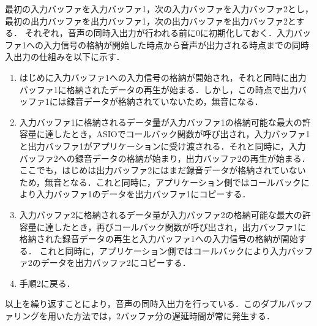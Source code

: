 最初の入力バッファを入力バッファ1，次の入力バッファを入力バッファ2とし，最初の出力バッファを出力バッファ1，次の出力バッファを出力バッファ2とする．
それぞれ，音声の同時入出力が行われる前に0に初期化しておく．入力バッファ1への入力信号の格納が開始した時点から音声が出力される時点までの同時入出力の仕組みを以下に示す．
\begin{enumerate}[leftmargin=*]
\item はじめに入力バッファ1への入力信号の格納が開始され，それと同時に出力バッファ1に格納されたデータの再生が始まる．しかし，この時点で出力バッファ1には録音データが格納されていないため，無音になる．
\item 入力バッファ1に格納されるデータ量が入力バッファ1の格納可能な最大の許容量に達したとき，ASIOでコールバック関数が呼び出され，入力バッファ1と出力バッファ1がアプリケーションに受け渡される．それと同時に，入力バッファ2への録音データの格納が始まり，出力バッファ2の再生が始まる．ここでも，はじめは出力バッファ2にはまだ録音データが格納されていないため，無音となる．これと同時に，アプリケーション側ではコールバックにより入力バッファ1のデータを出力バッファ1にコピーする．
\item 入力バッファ2に格納されるデータ量が入力バッファ2の格納可能な最大の許容量に達したとき，再びコールバック関数が呼び出され，出力バッファ1に格納された録音データの再生と入力バッファ1への入力信号の格納が開始する．
これと同時に，アプリケーション側ではコールバックにより入力バッファ2のデータを出力バッファ2にコピーする．
\item 手順2に戻る．
\end{enumerate}
以上を繰り返すことにより，音声の同時入出力を行っている．このダブルバッファリングを用いた方法では，2バッファ分の遅延時間が常に発生する．
